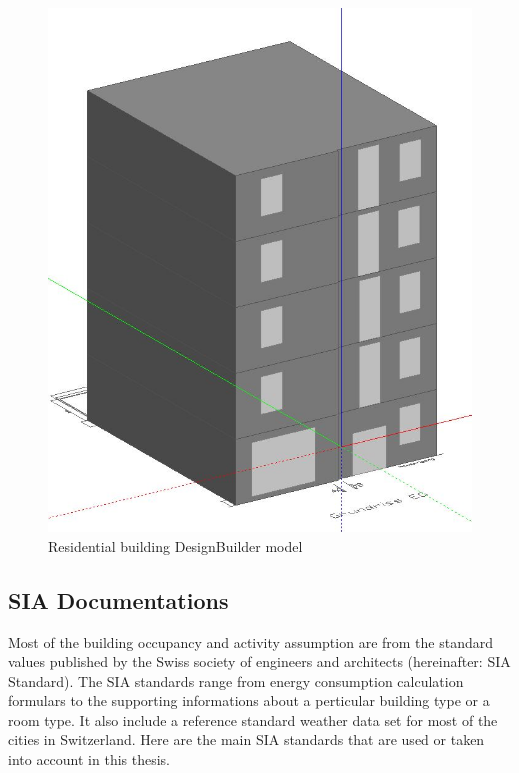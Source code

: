\documentclass[11pt, a4paper]{article}
\theoremstyle{definition}
\begin{document}
			\begin{figure}[H]
			\centering
			\includegraphics[scale=0.45]{HonggDesignBuilderModel.JPG}
			\caption{Residential building DesignBuilder model}
			\label{fig:HonggDB}
			\end{figure}

			\subsection{SIA Documentations}
		Most of the building occupancy and activity assumption are from the standard values published by the Swiss society of engineers and architects (hereinafter: SIA Standard). The SIA standards range from energy consumption calculation formulars to the supporting informations about a perticular building type or a room type. It also include a reference standard weather data set for most of the cities in Switzerland. Here are the main SIA standards that are used or taken into account in this thesis.\\
\end{document}
